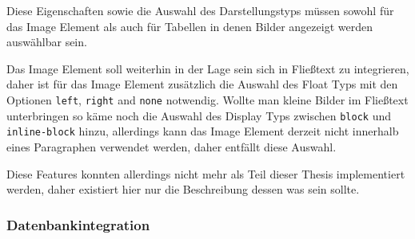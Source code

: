 Diese Eigenschaften sowie die Auswahl des Darstellungstyps müssen sowohl für das
Image Element als auch für Tabellen in denen Bilder angezeigt werden auswählbar
sein.

Das Image Element soll weiterhin in der Lage sein sich in Fließtext zu
integrieren, daher ist für das Image Element zusätzlich die Auswahl des Float
Typs mit den Optionen \texttt{left}, \texttt{right} and \texttt{none} notwendig.
Wollte man kleine Bilder im Fließtext unterbringen so käme noch die Auswahl des
Display Typs zwischen \texttt{block} und \texttt{inline-block} hinzu, allerdings
kann das Image Element derzeit nicht innerhalb eines Paragraphen verwendet
werden, daher entfällt diese Auswahl.

Diese Features konnten allerdings nicht mehr als Teil dieser Thesis
implementiert werden, daher existiert hier nur die Beschreibung dessen was sein
sollte.

\subsubsection{Datenbankintegration}
\label{subsec:4-database-integration}

